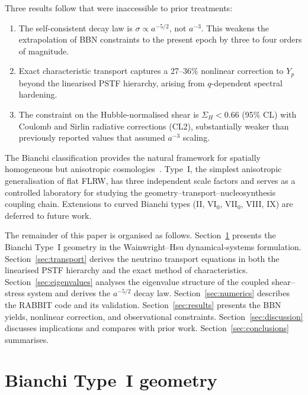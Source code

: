 \documentclass[a4paper,11pt]{article}
\newcommand{\SigH}{\Sigma_H}
\newcommand{\Yp}{Y_p}
\begin{document}
Three results follow that were inaccessible to prior treatments:
\begin{enumerate}
\item The self-consistent decay law is $\sigma \propto a^{-5/2}$, not $a^{-3}$.  This weakens the extrapolation of BBN constraints to the present epoch by three to four orders of magnitude.
\item Exact characteristic transport captures a 27--36\% nonlinear correction to $\Yp$ beyond the linearised PSTF hierarchy, arising from $q$-dependent spectral hardening.
\item The constraint on the Hubble-normalised shear is $\SigH < 0.66$ (95\% CL) with Coulomb and Sirlin radiative corrections (CL2), substantially weaker than previously reported values that assumed $a^{-3}$ scaling.
\end{enumerate}

The Bianchi classification provides the natural framework for spatially homogeneous but anisotropic cosmologies~\cite{WainwrightEllis1997}.  Type~I, the simplest anisotropic generalisation of flat FLRW, has three independent scale factors and serves as a controlled laboratory for studying the geometry--transport--nucleosynthesis coupling chain.  Extensions to curved Bianchi types (II, VI$_0$, VII$_0$, VIII, IX) are deferred to future work.

The remainder of this paper is organised as follows.  Section~\ref{sec:geometry} presents the Bianchi Type~I geometry in the Wainwright--Hsu dynamical-systems formulation.  Section~\ref{sec:transport} derives the neutrino transport equations in both the linearised PSTF hierarchy and the exact method of characteristics.  Section~\ref{sec:eigenvalues} analyses the eigenvalue structure of the coupled shear--stress system and derives the $a^{-5/2}$ decay law.  Section~\ref{sec:numerics} describes the RABBIT code and its validation.  Section~\ref{sec:results} presents the BBN yields, nonlinear correction, and observational constraints.  Section~\ref{sec:discussion} discusses implications and compares with prior work.  Section~\ref{sec:conclusions} summarises.


\section{Bianchi Type~I geometry}\label{sec:geometry}
\end{document}

